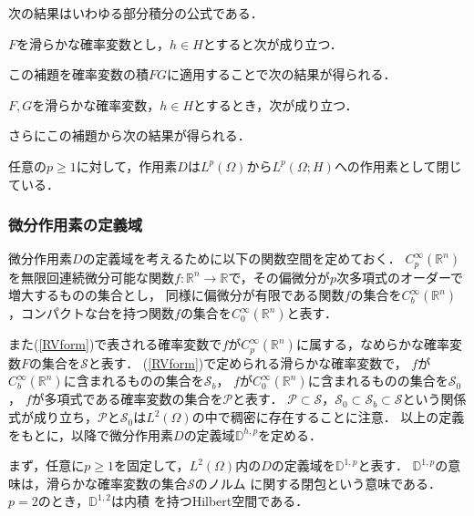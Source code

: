 次の結果はいわゆる部分積分の公式である．
\begin{lemma}\label{lem1.2.1}%
$F$を滑らかな確率変数とし，$h\in H$とすると次が成り立つ．
\end{lemma}
この補題を確率変数の積$FG$に適用することで次の結果が得られる．
\begin{lemma}\label{lem1.2.2}%
$F,G$を滑らかな確率変数，$h\in H$とするとき，次が成り立つ．
\end{lemma}
さらにこの補題から次の結果が得られる．
\begin{proposition}\label{prop1.2.1}%
任意の$p\ge1$に対して，作用素$D$は$L^p(\Omega)$から$L^p(\Omega;H)$への作用素として閉じている．
\end{proposition}

\subsubsection{微分作用素の定義域}
微分作用素$D$の定義域を考えるために以下の関数空間を定めておく．
$C_p^\infty(\mathbb{R}^n)$を無限回連続微分可能な関数$f:\mathbb{R}^n\rightarrow\mathbb{R}$で，その偏微分が$p$次多項式のオーダーで増大するものの集合とし，
同様に偏微分が有限である関数$f$の集合を$C^\infty_b(\mathbb{R}^n)$，コンパクトな台を持つ関数$f$の集合を$C^\infty_0(\mathbb{R}^n)$と表す．

また(\ref{RVform})で表される確率変数で$f$が$C_p^\infty(\mathbb{R}^n)$に属する，なめらかな確率変数$F$の集合を$\mathcal{S}$と表す．
(\ref{RVform})で定められる滑らかな確率変数で，
$f$が$C_b^\infty(\mathbb{R}^n)$に含まれるものの集合を$\mathcal{S}_b$，
$f$が$C_0^\infty(\mathbb{R}^n)$に含まれるものの集合を$\mathcal{S}_0$，
$f$が多項式である確率変数の集合を$\mathcal{P}$と表す．
$\mathcal{P}\subset\mathcal{S}$，$\mathcal{S}_0\subset\mathcal{S}_b\subset\mathcal{S}$という関係式が成り立ち，$\mathcal{P}$と$\mathcal{S}_0$は$L^2(\Omega)$の中で稠密に存在することに注意．
以上の定義をもとに，以降で微分作用素$D$の定義域$\mathbb{D}^{h,p}$を定める．

まず，任意に$p\ge1$を固定して，$L^2(\Omega)$内の$D$の定義域を$\mathbb{D}^{1,p}$と表す．
$\mathbb{D}^{1,p}$の意味は，滑らかな確率変数の集合$\mathcal{S}$のノルム
に関する閉包という意味である．
$p=2$のとき，$\mathbb{D}^{1,2}$は内積
を持つHilbert空間である．

